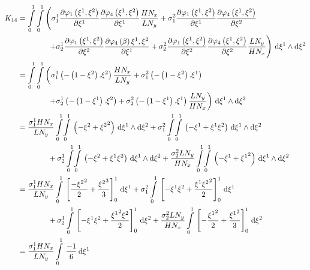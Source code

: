 \begin{equation}
  \begin{aligned}
    K_{14}&=\dintl{0}{1}\dintl{0}{1}\left(
    \conductivitytensorsymbol^{1}_{1}\delby{\lbfn{1}{\xione,\xitwo}}{\xione}
    \delby{\lbfn{4}{\xione,\xitwo}}{\xione}\dfrac{H N_{x}}{L N_{y}}+
    \conductivitytensorsymbol^{2}_{1}\delby{\lbfn{1}{\xione,\xitwo}}{\xione}
    \delby{\lbfn{4}{\xione,\xitwo}}{\xitwo}\right.\\
    &\qquad\qquad\left.+\conductivitytensorsymbol^{1}_{2}\delby{\lbfn{1}{\xione,\xitwo}}{\xitwo}
    \delby{\lbfn{4}{\beta}{\xione,\xitwo}}{\xione}+
    \conductivitytensorsymbol^{2}_{2}\delby{\lbfn{1}{\xione,\xitwo}}{\xitwo}
    \delby{\lbfn{4}{\xione,\xitwo}}{\xitwo}\dfrac{L N_{y}}{H N_{x}}\right)\infinitesimaltwo{\xione}{\xitwo}\\
    &=\dintl{0}{1}\dintl{0}{1}\left(
    \conductivitytensorsymbol^{1}_{1}\pbrac{-\pbrac{1-\xitwo}.\xitwo}\dfrac{H N_{x}}{L N_{y}}+
    \conductivitytensorsymbol^{2}_{1}\pbrac{-\pbrac{1-\xitwo}.\xione}\right.\\
    &\qquad\qquad\left.+\conductivitytensorsymbol^{1}_{2}\pbrac{-\pbrac{1-\xione}.\xitwo}+
    \conductivitytensorsymbol^{2}_{2}\pbrac{-\pbrac{1-\xione}.\xione}\dfrac{L N_{y}}{H N_{x}}\right)
    \infinitesimaltwo{\xione}{\xitwo}\\
    &=\dfrac{\conductivitytensorsymbol^{1}_{1} H N_{x}}{L N_{y}}\giint{0}{1}{0}{1}{\pbrac{-\xitwo+\xitwosq}}{\xione}{\xitwo}
    +\conductivitytensorsymbol^{2}_{1}\giint{0}{1}{0}{1}{\pbrac{-\xione+\xione\xitwo}}{\xione}{\xitwo}\\
    &\qquad\qquad+\conductivitytensorsymbol^{1}_{2}\giint{0}{1}{0}{1}{\pbrac{-\xitwo+\xione\xitwo}}{\xione}{\xitwo}
    +\dfrac{\conductivitytensorsymbol^{2}_{2} L N_{y}}{H N_{x}}\giint{0}{1}{0}{1}{\pbrac{-\xione+\xionesq}}{\xione}{\xitwo} \\
    &=\dfrac{\conductivitytensorsymbol^{1}_{1} H N_{x}}{L N_{y}}\gint{0}{1}{\sqbrac{\dfrac{-\xitwosq}{2}+\dfrac{\xitwocube}{3}}^{1}_{0}}{\xione}
    +\conductivitytensorsymbol^{2}_{1}\gint{0}{1}{\sqbrac{-\xione\xitwo+\dfrac{\xione\xitwosq}{2}}^{1}_{0}}{\xione}\\
    &\qquad\qquad+\conductivitytensorsymbol^{1}_{2}\gint{0}{1}{\sqbrac{-\xione\xitwo+\dfrac{\xionesq\xitwo}{2}}^{1}_{0}}{\xitwo}
    +\dfrac{\conductivitytensorsymbol^{2}_{2} L N_{y}}{H N_{x}}\gint{0}{1}{\sqbrac{-\dfrac{\xionesq}{2}+\dfrac{\xionecube}{3}}^{1}_{0}}{\xitwo} \\
    &=\dfrac{\conductivitytensorsymbol^{1}_{1} H N_{x}}{L N_{y}}\gint{0}{1}{\dfrac{-1}{6}}{\xione}

\end{aligned}
\end{equation}
